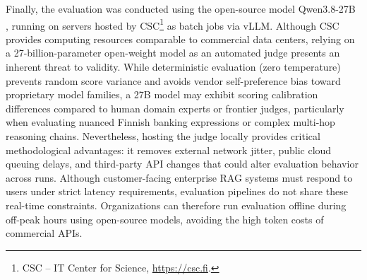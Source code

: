 Finally, the evaluation was conducted using the open-source model Qwen3.8-27B \citep{yang2025qwen3}, running on servers hosted by CSC\footnote{CSC -- IT Center for Science, \url{https://csc.fi}.} as batch jobs via vLLM. Although CSC provides computing resources comparable to commercial data centers, relying on a 27-billion-parameter open-weight model as an automated judge presents an inherent threat to validity. While deterministic evaluation (zero temperature) prevents random score variance and avoids vendor self-preference bias toward proprietary model families, a 27B model may exhibit scoring calibration differences compared to human domain experts or frontier judges, particularly when evaluating nuanced Finnish banking expressions or complex multi-hop reasoning chains. Nevertheless, hosting the judge locally provides critical methodological advantages: it removes external network jitter, public cloud queuing delays, and third-party API changes that could alter evaluation behavior across runs. Although customer-facing enterprise RAG systems must respond to users under strict latency requirements, evaluation pipelines do not share these real-time constraints. Organizations can therefore run evaluation offline during off-peak hours using open-source models, avoiding the high token costs of commercial APIs.

